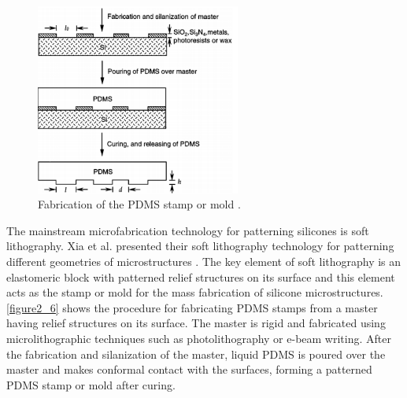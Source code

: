 \begin{figure}[h]%
\centering
\includegraphics[width=0.6\textwidth]{figures/literaturereview/figure2_6}%
\caption{Fabrication of the PDMS stamp or mold \cite{xia1998soft}.}%
\label{figure2_6}%
\end{figure}

The mainstream microfabrication technology for patterning silicones is soft lithography. Xia et al. presented their soft lithography technology for patterning different geometries of microstructures \cite{xia1998soft}. The key element of soft lithography is an elastomeric block with patterned relief structures on its surface and this element acts as the stamp or mold for the mass fabrication of silicone microstructures. \autoref{figure2_6} shows the procedure for fabricating PDMS stamps from a master having relief structures on its surface. The master is rigid and fabricated using microlithographic techniques such as photolithography or e-beam writing.  After the fabrication and silanization of the master, liquid PDMS is poured over the master and makes conformal contact with the surfaces, forming a patterned PDMS stamp or mold after curing. 

